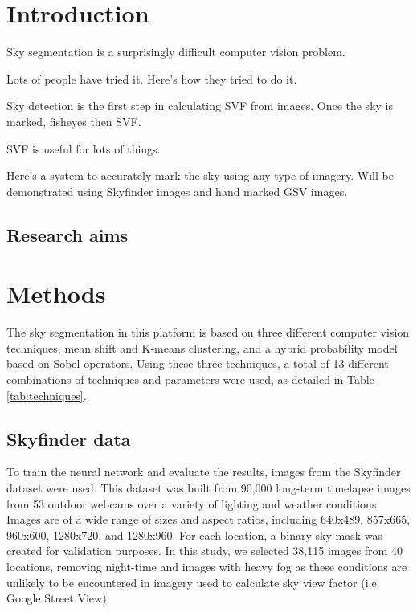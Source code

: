 \documentclass[final,3p,times,authoryear]{elsarticle}
\begin{document}
\section{Introduction}\label{sec:introduction}

Sky segmentation is a surprisingly difficult computer vision problem. 

Lots of people have tried it. Here's how they tried to do it.

Sky detection is the first step in calculating SVF from images. Once the sky is marked, fisheyes then SVF.

SVF is useful for lots of things.

Here's a system to accurately mark the sky using any type of imagery. Will be demonstrated using Skyfinder images and hand marked GSV images.


\subsection{Research aims}





\section{Methods}\label{sec:Methods}

The sky segmentation in this platform is based on three different computer vision techniques, mean shift and K-means clustering, and a hybrid probability model based on Sobel operators. Using these three techniques, a total of 13 different combinations of techniques and parameters were used, as detailed in Table \ref{tab:techniques}.




\subsection{Skyfinder data}\label{sec:finderdata}
To train the neural network and evaluate the results, images from the Skyfinder dataset \citep{Mihail2016} were used. This dataset was built from 90,000 long-term timelapse images from 53 outdoor webcams over a variety of lighting and weather conditions. Images are of a wide range of sizes and aspect ratios, including 640x489, 857x665, 960x600, 1280x720, and 1280x960. For each location, a binary sky mask was created for validation purposes. In this study, we selected 38,115 images from 40 locations, removing night-time and images with heavy fog as these conditions are unlikely to be encountered in imagery used to calculate sky view factor (i.e. Google Street View).
\end{document}
